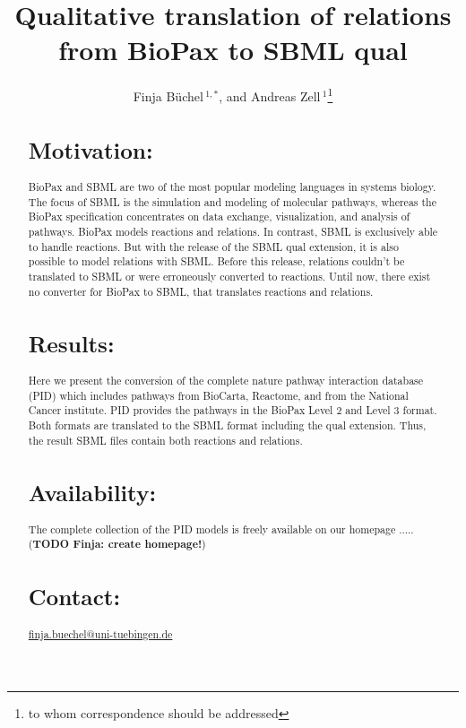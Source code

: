 \documentclass{bioinfo}
\begin{document}

\title[BioPax to SBML qual]{Qualitative translation of relations from BioPax to SBML qual}
\author[B\"uchel \textit{et~al}]{Finja B\"uchel\,$^{1,*}$,
and Andreas Zell\,$^1$\footnote{to whom correspondence should be addressed}}
\address{$^{1}$Department of Cognitive Systems, University of Tuebingen, Sand 1, 72076 T\"ubingen, Germany\\}




\maketitle

\begin{abstract}

\section{Motivation:}
BioPax and SBML are two of the most popular modeling languages in systems biology. The focus of SBML is the simulation and modeling of molecular pathways, whereas the BioPax specification concentrates on data exchange, visualization, and analysis of pathways. BioPax models reactions and relations. In contrast, SBML is exclusively able to handle reactions. But with the release of the SBML qual extension, it is also possible to model relations with SBML. Before this release, relations couldn't be translated to SBML or were erroneously converted to reactions. Until now, there exist no converter for BioPax to SBML, that translates reactions and relations.
\section{Results:}
Here we present the conversion of the complete nature pathway interaction database (PID) which includes pathways from BioCarta, Reactome, and from the National Cancer institute. PID provides the pathways in the BioPax Level 2 and Level 3 format. Both formats are translated to the SBML format including the qual extension. Thus, the result SBML files contain both reactions and relations.
\section{Availability:}
The complete collection of the PID models is freely available on our homepage ..... (\textbf{TODO Finja: create homepage!})
\section{Contact:} \href{finja.buechel@uni-tuebingen.de}{finja.buechel@uni-tuebingen.de}
\end{abstract}
\end{document}
